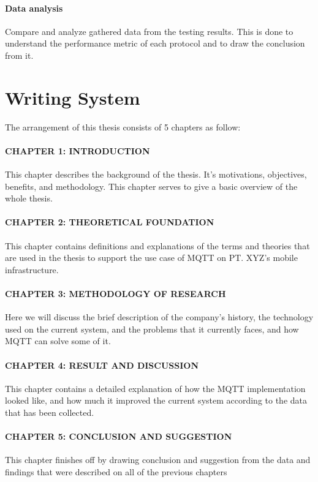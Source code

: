 \paragraph{Data analysis}
Compare and analyze gathered data from the testing results. This is done to understand the performance metric of each protocol and to draw the conclusion from it.

\section{Writing System}
The arrangement of this thesis consists of 5 chapters as follow:
\paragraph{CHAPTER 1: INTRODUCTION}
This chapter describes the background of the thesis. It's motivations, objectives, benefits, and methodology. This chapter serves to give a basic overview of the whole thesis.
\paragraph{CHAPTER 2: THEORETICAL FOUNDATION}
This chapter contains definitions and explanations of the terms and theories that are used in the thesis to support the use case of MQTT on PT. XYZ's mobile infrastructure.
\paragraph{CHAPTER 3: METHODOLOGY OF RESEARCH}
Here we will discuss the brief description of the company's history, the technology used on the current system, and the problems that it currently faces, and how MQTT can solve some of it.
\paragraph{CHAPTER 4: RESULT AND DISCUSSION}
This chapter contains a detailed explanation of how the MQTT implementation looked like, and how much it improved the current system according to the data that has been collected.
\paragraph{CHAPTER 5: CONCLUSION AND SUGGESTION}
This chapter finishes off by drawing conclusion and suggestion from the data and findings that were described on all of the previous chapters
